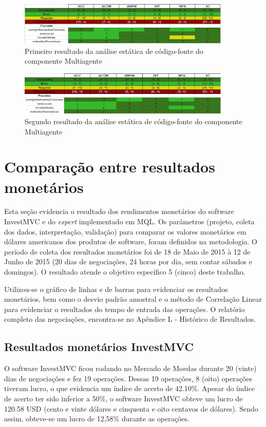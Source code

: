 \begin{figure}[H]
\centering
\includegraphics[width=0.9\textwidth]{figuras/analiseinicial}
\caption{Primeiro resultado da análise estática de código-fonte do componente Multiagente}
\label{analiseinicial}
\end{figure}

\begin{figure}[H]
\centering
\includegraphics[width=0.9\textwidth]{figuras/analisefinal}
\caption{Segundo resultado da análise estática de código-fonte do componente Multiagente}
\label{analisefinal}
\end{figure}

\section{Comparação entre resultados monetários}
Esta seção evidencia o resultado dos rendimentos monetários do software InvestMVC e do \textit{expert} implementado em MQL. Os parâmetros (projeto, coleta dos dados, interpretação, validação) para comparar os valores monetários em dólares americanos dos produtos de software, foram definidos na metodologia. O período de coleta dos resultados monetários foi de 18 de Maio de 2015 à 12 de Junho de 2015 (20 dias de negociações, 24 horas por dia, sem contar sábados e domingos). O resultado atende o objetivo específico 5 (cinco) deste trabalho.

Utilizou-se o gráfico de linhas e de barras para evidenciar os resultados monetários, bem como o desvio padrão amostral e o método de Correlação Linear para evidenciar o resultados do tempo de entrada das operações. O relatório completo das negociações, encontra-se no Apêndice L - Histórico de Resultados.


\subsection{Resultados monetários InvestMVC}
O software InvestMVC ficou rodando no Mercado de Moedas durante 20 (vinte) dias de negociações e fez 19 operações. Dessas 19 operações, 8 (oito) operações tiveram lucro, o que evidencia um índice de acerto de 42.10\%. Apesar do índice de acerto ter sido inferior a 50\%, o software InvestMVC obteve um lucro de 120.58 USD (cento e vinte dólares e cinquenta e oito centavos de dólares). Sendo assim, obteve-se um lucro de 12,58\% durante as operações.

